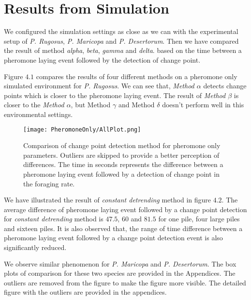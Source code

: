 \section{\label{section:Results from Simulation}Results from Simulation}
We configured the simulation settings as close as we can with the experimental setup of \textit{P. Rugosus}, \textit{P. Maricopa} and \textit{P. Desertorum}. Then we have compared the result of method \textit{alpha}, \textit{beta}, \textit{gamma} and \textit{delta}. based on the time between a pheromone laying event followed by the detection of change point.\par 
Figure $4.1$ compares the results of four different methods on a pheromone only simulated environment for \textit{P. Rugosus}. We can see that, \textit{Method $\alpha$} detects change points which is closer to the pheromone laying event. The result of \textit{Method $\beta$} is closer to the \textit{Method $\alpha$}, but {Method $\gamma$} and {Method $\delta$} doesn't perform well in this environmental settings.\par 
\begin{figure}[H]
	\texttt{[image: PheromoneOnly/AllPlot.png]}
	\caption{Comparison of change point detection method for pheromone only parameters. Outliers are skipped to provide a better perception of differences. The time in seconds represents the difference between a pheromone laying event followed by a detection of change point in the foraging rate.}
\end{figure}
We have illustrated the result of \textit{constant detrending} method in figure $4.2$. The average difference of pheromone laying event followed by a change point detection for \textit{constant detrending} method is $47.5$, $60$ and $81.5$ for one pile, four large piles and sixteen piles. It is also observed that, the range of time difference between a pheromone laying event followed by a change point detection event is also significantly reduced.\par 
We observe similar phenomenon for \textit{P. Maricopa} and \textit{P. Desertorum}. The box plots of comparison for these two species are provided in the Appendices. The outliers are removed from the figure to make the figure more visible. The detailed figure with the outliers are provided in the appendices.\par 

